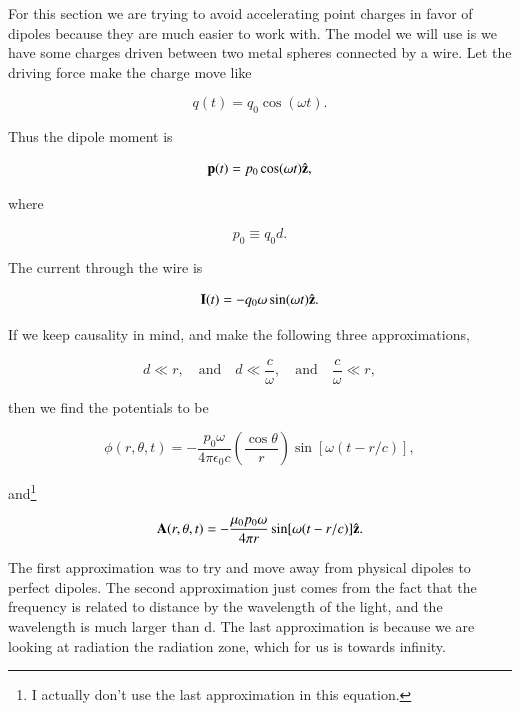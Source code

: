 \documentclass[preprint, review,12pt]{elsarticle}
\def\b{\textbf}
\def\={\equiv}
\def\and{\quad \text{and} \quad}
\def\9{\left(}
\def\0{\right)}
\newcommand{\hb}[1]{\hat{\b #1}}
\begin{document}
For this section we are trying to avoid accelerating point charges in favor of dipoles because they are much easier to work with. The model we will use is we have some charges driven between two metal spheres connected by a wire. Let the driving force make the charge move like

\begin{equation}
    q(t) = q_0 \cos(\omega t).
\end{equation}

Thus the dipole moment is 

\begin{equation}
    \b p(t) = p_0 \cos(\omega t) \hb{z},
\end{equation}

where 

\begin{equation}
    p_0 \= q_0d.
\end{equation}

The current through the wire is

\begin{equation}
    \b I(t) = -q_0 \omega \sin(\omega t) \hb{z}.
\end{equation}

If we keep causality in mind, and make the following three approximations, 

\begin{equation}
    d \ll r, \and d \ll \frac{c}{\omega}, \and \frac{c}{\omega} \ll r,
\end{equation}

then we find the potentials to be

\begin{equation}
    \phi(r, \theta, t) = -\frac{p_0 \omega}{4 \pi \epsilon_0 c} \9 \frac{\cos \theta}{r} \0 \sin[\omega(t-r/c)],
\end{equation}

and\footnote{I actually don't use the last approximation in this equation.}

\begin{equation}
    \b A(r, \theta, t) = -\frac{\mu_0 p_0 \omega}{4 \pi r} \sin[\omega(t-r/c)] \hb{z}.
\end{equation}

The first approximation was to try and move away from physical dipoles to perfect dipoles. The second approximation just comes from the fact that the frequency is related to distance by the wavelength of the light, and the wavelength is much larger than d. The last approximation is because we are looking at radiation the radiation zone, which for us is towards infinity.
\end{document}
